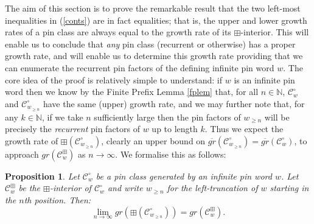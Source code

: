 \documentclass[11pt,a4paper]{article}
\newtheorem{prop}[thm]{Proposition}
\theoremstyle{definition}
\begin{document}
The aim of this section is to prove the remarkable result that the two left-most inequalities in (\ref{conts}) are in fact equalities; that is, the upper and lower growth rates of a pin class are always equal to the growth rate of its $\boxplus$-interior. This will enable us to conclude that \emph{any} pin class (recurrent or otherwise) has a proper growth rate, and will enable us to determine this growth rate providing that we can enumerate the recurrent pin factors of the defining infinite pin word $w$. The core idea of the proof is relatively simple to understand: if $w$ is an infinite pin word then we know by the Finite Prefix Lemma \ref{fplem} that, for all $n \in \mathbb{N}$, $\mathcal{C}^{\circ}_{w}$ and $\mathcal{C}^{\circ}_{w_{\geq n}}$ have the same (upper) growth rate, and we may further note that, for any $k \in \mathbb{N}$, if we take $n$ sufficiently large then the pin factors of $w_{\geq n}$ will be precisely the \emph{recurrent} pin factors of $w$ up to length $k$. Thus we expect the growth rate of $\boxplus(\mathcal{C}^{\circ}_{w_{\geq n}})$, clearly an upper bound on $\overline{gr}(\mathcal{C}^{\circ}_{w_{\geq n}}) = \overline{gr}(\mathcal{C}^{\circ}_{w})$, to approach $gr(\mathcal{C}^{\boxplus}_{w})$ as $n \rightarrow \infty$. We formalise this as follows:

\begin{prop} \label{limprop}
Let $\mathcal{C}^{\circ}_{w}$ be a pin class generated by an infinite pin word $w$. Let $\mathcal{C}^{\boxplus}_{w}$ be the $\boxplus$-interior of $\mathcal{C}^{\circ}_{w}$ and write $w_{\geq n}$ for the left-truncation of $w$ starting in the $n$th position. Then:
\[
\lim_{n\rightarrow\infty}gr\left(\boxplus(\mathcal{C}^{\circ}_{w_{\geq n}})\right) = gr(\mathcal{C}^{\boxplus}_{w}).
\]
\end{prop}
\end{document}

